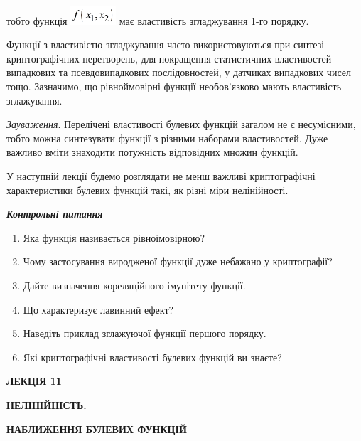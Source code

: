 тобто функція 
\includegraphics[width=0.6665in,height=0.278in]{crypt-img/crypt-img255.png} 
має властивість згладжування 1-го порядку.

Функції з властивістю згладжування часто використовуються при синтезі
криптографічних перетворень, для покращення статистичних властивостей
випадкових та псевдовипадкових послідовностей, у датчиках випадкових чисел
тощо. Зазначимо, що рівноймовірні функції необов’язково мають  властивість
зглажування. 

\textit{Зауваження}. Перелічені властивості булевих функцій загалом не є
несумісними, тобто можна синтезувати функції з різними наборами властивостей.
Дуже важливо вміти знаходити потужність відповідних множин функцій. 

У наступній лекції будемо розглядати не менш важливі криптографічні
характеристики булевих функцій такі, як різні міри нелінійності.  


\bigskip

{\centering\bfseries\itshape
Контрольні питання 
\par}


\bigskip


\bigskip

\liststyleWWviiiNumxxv
\begin{enumerate}
\item Яка функція називається рівноімовірною?
\item Чому застосування  виродженої функції дуже небажано у криптографії? 
\item Дайте визначення кореляційного імунітету функції.
\item Що характеризує лавинний ефект?
\item Наведіть приклад зглажуючої функції першого порядку.
\item Які криптографічні властивості булевих функцій ви знаєте? 
\end{enumerate}

\bigskip


\bigskip


\bigskip


\bigskip

{\bfseries
ЛЕКЦІЯ  11}


\bigskip

{\centering\bfseries
НЕЛІНІЙНІСТЬ.
\par}

{\centering\bfseries
 НАБЛИЖЕННЯ  БУЛЕВИХ  ФУНКЦІЙ 
\par}


